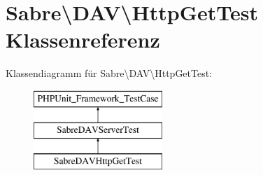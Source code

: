 \hypertarget{class_sabre_1_1_d_a_v_1_1_http_get_test}{}\section{Sabre\textbackslash{}D\+AV\textbackslash{}Http\+Get\+Test Klassenreferenz}
\label{class_sabre_1_1_d_a_v_1_1_http_get_test}
Klassendiagramm für Sabre\textbackslash{}D\+AV\textbackslash{}Http\+Get\+Test\+:\begin{figure}[H]
\begin{center}
\leavevmode
\includegraphics[height=3.000000cm]{class_sabre_1_1_d_a_v_1_1_http_get_test}
\end{center}
\end{figure}
